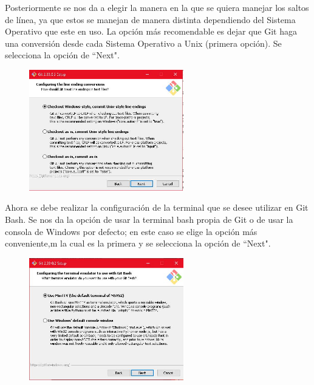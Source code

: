 \documentclass[10pt,a4paper]{article} %
\begin{document}
\begin{enumerate}
{			\pagebreak
			\item Posteriormente se nos da a elegir la manera en la que se quiera manejar los saltos de l{\' i}nea, ya que estos se manejan de manera distinta dependiendo del Sistema Operativo que este en uso. La opci{\' o}n más recomendable es dejar que Git haga una conversi{\' o}n desde cada Sistema Operativo a Unix (primera opci{\' o}n). Se selecciona la opci{\' o}n de ``Next".
			\begin{figure}[H]
				\includegraphics[width=0.6\textwidth]{13.jpg}
				\centering
				\label{img:paso13}
			\end{figure}
			\item Ahora se debe realizar la configuraci{\' o}n de la terminal que se desee utilizar en Git Bash. Se nos da la opci{\' o}n de usar la terminal bash propia de Git o  de usar la consola de Windows por defecto; en este caso se elige la opci{\' o}n m{\' a}s conveniente,m la cual es la primera y se selecciona la opci{\' o}n de ``Next".
			\begin{figure}[H]
				\includegraphics[width=0.6\textwidth]{14.jpg}
				\centering
				\label{img:paso14}
			\end{figure}
			
}
\end{enumerate}
\end{document}
